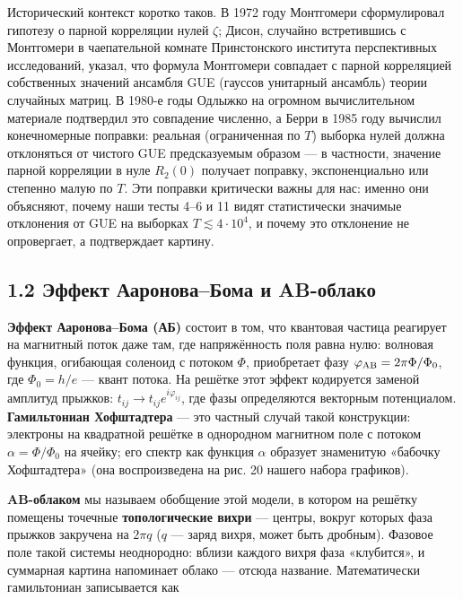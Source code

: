 \documentclass[
]{article}
\begin{document}
Исторический контекст коротко таков. В 1972 году Монтгомери
сформулировал гипотезу о парной корреляции нулей \(\zeta\); Дисон,
случайно встретившись с Монтгомери в чаепательной комнате Принстонского
института перспективных исследований, указал, что формула Монтгомери
совпадает с парной корреляцией собственных значений ансамбля GUE
(гауссов унитарный ансамбль) теории случайных матриц. В 1980-е годы
Одлыжко на огромном вычислительном материале подтвердил это совпадение
численно, а Берри в 1985 году вычислил конечномерные поправки: реальная
(ограниченная по \(T\)) выборка нулей должна отклоняться от чистого GUE
предсказуемым образом --- в частности, значение парной корреляции в нуле
\(R_2(0)\) получает поправку, экспоненциально или степенно малую по
\(T\). Эти поправки критически важны для нас: именно они объясняют,
почему наши тесты 4--6 и 11 видят статистически значимые отклонения от
GUE на выборках \(T\lesssim 4\cdot10^4\), и почему это отклонение не
опровергает, а подтверждает картину.

\subsection{1.2 Эффект Ааронова--Бома и
AB-облако}\label{ux44dux444ux444ux435ux43aux442-ux430ux430ux440ux43eux43dux43eux432ux430ux431ux43eux43cux430-ux438-ab-ux43eux431ux43bux430ux43aux43e}

\textbf{Эффект Ааронова--Бома (АБ)} состоит в том, что квантовая частица
реагирует на магнитный поток даже там, где напряжённость поля равна
нулю: волновая функция, огибающая соленоид с потоком \(\Phi\),
приобретает фазу \(\varphi_{\rm AB} = 2\pi\Phi/\Phi_0\), где
\(\Phi_0 = h/e\) --- квант потока. На решётке этот эффект кодируется
заменой амплитуд прыжков: \(t_{ij}\to t_{ij}e^{i\varphi_{ij}}\), где
фазы определяются векторным потенциалом. \textbf{Гамильтониан
Хофштадтера} --- это частный случай такой конструкции: электроны на
квадратной решётке в однородном магнитном поле с потоком
\(\alpha = \Phi/\Phi_0\) на ячейку; его спектр как функция \(\alpha\)
образует знаменитую «бабочку Хофштадтера» (она воспроизведена на рис. 20
нашего набора графиков).

\textbf{AB-облаком} мы называем обобщение этой модели, в котором на
решётку помещены точечные \textbf{топологические вихри} --- центры,
вокруг которых фаза прыжков закручена на \(2\pi q\) (\(q\) --- заряд
вихря, может быть дробным). Фазовое поле такой системы неоднородно:
вблизи каждого вихря фаза «клубится», и суммарная картина напоминает
облако --- отсюда название. Математически гамильтониан записывается как
\end{document}
